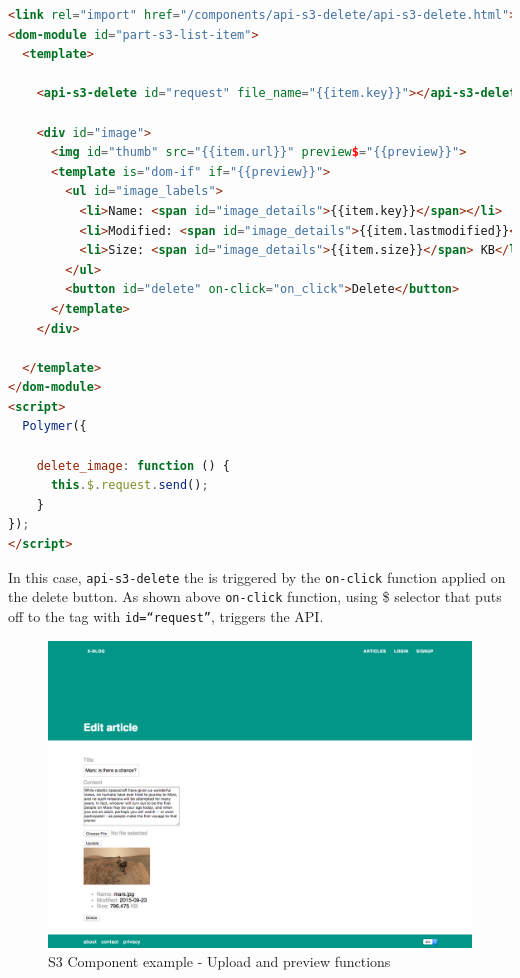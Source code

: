 \begin{lstlisting}[language=html]
<link rel="import" href="/components/api-s3-delete/api-s3-delete.html">
<dom-module id="part-s3-list-item">
  <template>

    <api-s3-delete id="request" file_name="{{item.key}}"></api-s3-delete>

    <div id="image">
      <img id="thumb" src="{{item.url}}" preview$="{{preview}}">
      <template is="dom-if" if="{{preview}}">
        <ul id="image_labels">
          <li>Name: <span id="image_details">{{item.key}}</span></li>
          <li>Modified: <span id="image_details">{{item.lastmodified}}</span></li>
          <li>Size: <span id="image_details">{{item.size}}</span> KB</li>
        </ul>
        <button id="delete" on-click="on_click">Delete</button>
      </template>
    </div>

  </template>
</dom-module>
<script>
  Polymer({

    delete_image: function () {
      this.$.request.send();
    }
});
</script>
\end{lstlisting}


In this case, \texttt{api-s3-delete} the is triggered by the \texttt{on-click} function applied on the delete button. As shown above \texttt{on-click} function, using \$ selector that puts off to the tag with \texttt{id=``request''}, triggers the API.


\begin {figure}[h]
\graphicspath{{images/chapter_s3/}}
\includegraphics[width=\textwidth]{s3_example}
\caption{S3 Component example - Upload and preview functions}
\end {figure}

